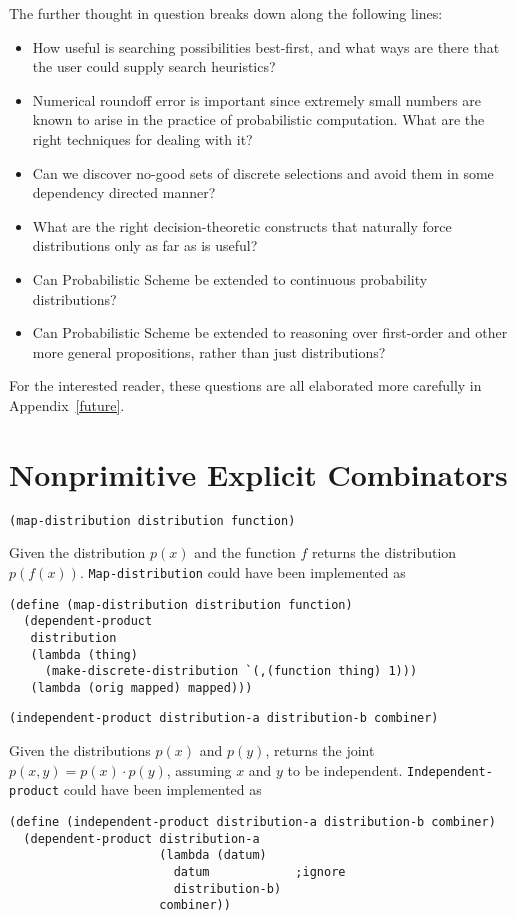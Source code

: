 \documentclass[12pt]{article}
\newcommand{\code}[1]{\texttt{#1}}
\begin{document}
The further thought in question breaks down along the following lines:
\begin{itemize}
\item How useful is searching possibilities best-first,
and what ways are there that the user could supply search heuristics?
\item Numerical roundoff error is important since extremely small
numbers are known to arise in the practice of probabilistic computation.
What are the right techniques for dealing with it?
\item Can we discover no-good sets of discrete selections
and avoid them in some dependency directed manner?
\item What are the right decision-theoretic constructs that naturally 
force distributions only as far as is useful?
\item Can Probabilistic Scheme be extended to continuous probability
distributions?
\item Can Probabilistic Scheme be extended to reasoning over
first-order and other more general propositions, rather than just
distributions?
\end{itemize}
For the interested reader, these questions are all elaborated more
carefully in Appendix~\ref{future}.

\appendix

\section{Nonprimitive Explicit Combinators}
\label{library}

\begin{verbatim}
(map-distribution distribution function)
\end{verbatim}

Given the distribution $p(x)$ and the function $f$ returns the 
distribution $p(f(x))$.  \code{Map-distribution} could have been
implemented as
\begin{verbatim}
(define (map-distribution distribution function)
  (dependent-product
   distribution
   (lambda (thing)
     (make-discrete-distribution `(,(function thing) 1)))
   (lambda (orig mapped) mapped)))
\end{verbatim}

\begin{verbatim}
(independent-product distribution-a distribution-b combiner)
\end{verbatim}

Given the distributions $p(x)$ and $p(y)$, returns
the joint $p(x,y) = p(x) \cdot p(y)$, assuming $x$ and $y$
to be independent.  \code{Independent-product} could have been 
implemented as
\begin{verbatim}
(define (independent-product distribution-a distribution-b combiner)
  (dependent-product distribution-a
                     (lambda (datum)
                       datum            ;ignore
                       distribution-b)
                     combiner))
\end{verbatim}
\end{document}
